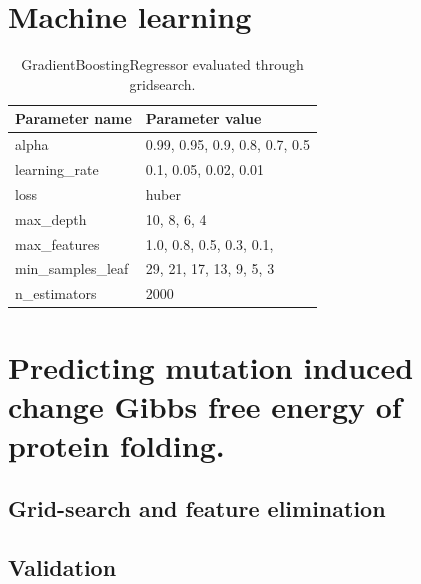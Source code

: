 


\section{Machine learning}

\begin{table}[!htb]
	\centering
	\caption[GradientBoostingRegressor parameters evaluated through gridsearch.]{GradientBoostingRegressor evaluated through gridsearch.}
	\label{tab:gridsearch_parameters}
	\begin{tabular}{ l | l }
		\toprule
		Parameter name     & Parameter value                \\
		\midrule
		alpha              & 0.99, 0.95, 0.9, 0.8, 0.7, 0.5 \\
		learning\_rate     & 0.1, 0.05, 0.02, 0.01          \\
		loss               & huber                          \\
		max\_depth         & 10, 8, 6, 4                    \\
		max\_features      & 1.0, 0.8, 0.5, 0.3, 0.1,       \\
		min\_samples\_leaf & 29, 21, 17, 13, 9, 5, 3        \\
		n\_estimators      & 2000                           \\
		\bottomrule
	\end{tabular}
\end{table}




\clearpage

\section{Predicting mutation induced change Gibbs free energy of protein folding.}

\subsection{Grid-search and feature elimination}

\subsection{Validation}


